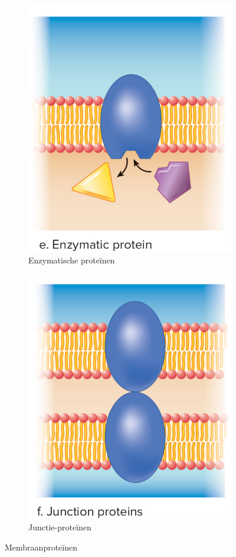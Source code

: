 \documentclass[a4paper,kul]{kulakarticle} %
\begin{document}
\begin{figure}[!htbp]
\medskip
	\begin{subfigure}{.5\textwidth}
		\centering
		\includegraphics[width=0.7\linewidth]{Enzymatischeprot}
		\caption{Enzymatische proteïnen}
		\label{fig:Enzymproteïnen}
	\end{subfigure}%
	\begin{subfigure}{.5\textwidth}
		\centering
		\includegraphics[width=0.7\linewidth]{Junctieprot}
		\caption{Junctie-proteïnen}
		\label{fig:Junctieproteïnen}
	\end{subfigure}
	\caption{Membraanproteïnen}
	\label{fig:membraanprot}
\end{figure}\\
\end{document}
